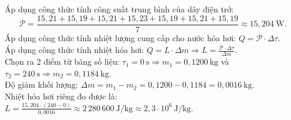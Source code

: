 \begin{ex}
{\begin{itemchoice}
\begin{center}
{
				}
			\end{center}
			\item Áp dụng công thức tính công suất trung bình của dây điện trở:\\
			$$\overline{\mathcal{P}} = \frac{15{,}21+15{,}19+15{,}21+15{,}23+15{,}19+15{,}21+15{,}19}{7} \approx 15{,}204\ \mathrm{W}.$$
			Áp dụng công thức tính nhiệt lượng cung cấp cho nước hóa hơi: $Q = \overline{\mathcal{P}} \cdot \Delta \tau$.\\
			Áp dụng công thức tính nhiệt hóa hơi: $Q = L \cdot \Delta m \Rightarrow L = \frac{\overline{\mathcal{P}} \cdot \Delta \tau}{\Delta m}$.\\
			Chọn ra 2 điểm từ bảng số liệu: $\tau_1 = 0\ \mathrm{s} \Rightarrow m_1 = 0{,}1200\ \mathrm{kg}$ và $\tau_2 = 240\ \mathrm{s} \Rightarrow m_2 = 0{,}1184\ \mathrm{kg}$.\\
			Độ giảm khối lượng: $\Delta m = m_1 - m_2 = 0{,}1200 - 0{,}1184 = 0{,}0016\ \mathrm{kg}$.\\
			Nhiệt hóa hơi riêng đo được là: 
			$L = \frac{15{,}204 \cdot (240 - 0)}{0{,}0016} \approx 2\,280\,600\ \mathrm{J/kg} \approx 2{,}3 \cdot 10^6\ \mathrm{J/kg}$.
		\end{itemchoice}
	}
\end{ex}

